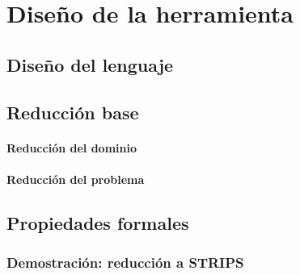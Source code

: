 
\chapter{Diseño de la herramienta}
\label{Chapter2}

\section{Diseño del lenguaje}

\section{Reducción base}
\subsubsection{Reducción del dominio}
\subsubsection{Reducción del problema}

\section{Propiedades formales}
\subsection{Demostración: reducción a STRIPS}
